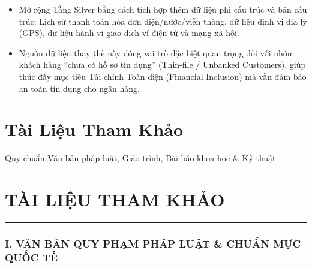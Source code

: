 \documentclass[
  13pt,
  a4paper,
]{report}
\providecommand{\tightlist}{%
  \setlength{\itemsep}{0pt}\setlength{\parskip}{0pt}}
\begin{document}
\begin{enumerate}
  \begin{itemize}
  \tightlist
  \item
    Mở rộng Tầng Silver bằng cách tích hợp thêm dữ liệu phi cấu trúc và
    bán cấu trúc: Lịch sử thanh toán hóa đơn điện/nước/viễn thông, dữ
    liệu định vị địa lý (GPS), dữ liệu hành vi giao dịch ví điện tử và
    mạng xã hội.
  \item
    Nguồn dữ liệu thay thế này đóng vai trò đặc biệt quan trọng đối với
    nhóm khách hàng ``chưa có hồ sơ tín dụng'' (Thin-file / Unbanked
    Customers), giúp thúc đẩy mục tiêu Tài chính Toàn diện (Financial
    Inclusion) mà vẫn đảm bảo an toàn tín dụng cho ngân hàng.
  \end{itemize}
\end{enumerate}


\chapter{Tài Liệu Tham Khảo}\label{tuxe0i-liux1ec7u-tham-khux1ea3o}

Quy chuẩn Văn bản pháp luật, Giáo trình, Bài báo khoa học \& Kỹ thuật

\hfill\break


\chapter{TÀI LIỆU THAM KHẢO}\label{tuxe0i-liux1ec7u-tham-khux1ea3o-1}

\begin{center}\rule{0.5\linewidth}{0.5pt}\end{center}

\subsection{I. VĂN BẢN QUY PHẠM PHÁP LUẬT \& CHUẨN MỰC QUỐC
TẾ}\label{i.-vux103n-bux1ea3n-quy-phux1ea1m-phuxe1p-luux1eadt-chuux1ea9n-mux1ef1c-quux1ed1c-tux1ebf}
\end{document}
